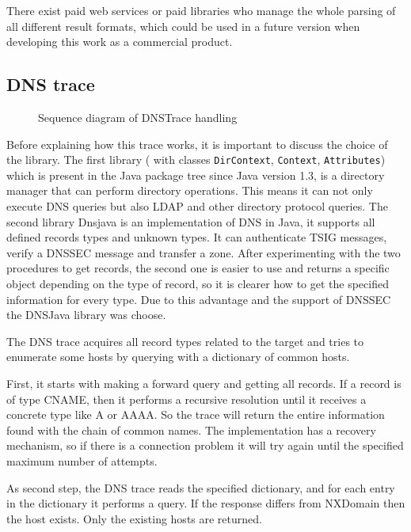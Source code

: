 \documentclass[
	a4paper,					10pt,							twoside,					openright,				notitlepage,			parskip=half,			]{scrreprt}
\begin{document}
There exist paid web services or paid libraries who manage the whole parsing of all 
different result formats, which could be used in a future version
when developing this work as a commercial product.

\subsection{\gls{DNS} trace}
\label{subsec:api_libstruct_dns}

\begin{figure}[H] 
\caption{Sequence diagram of DNSTrace handling}
\label{fig:seq-dnstrace}
\end{figure}

Before explaining how this trace works, it is important to discuss the choice of the library.
The first library ( with classes \verb|DirContext|, \verb|Context|, \verb|Attributes|) which 
is present in the Java package tree since Java version 1.3, is a directory manager that can 
perform directory operations. This means it can not only execute DNS queries but also LDAP and 
other directory protocol queries.
The second library Dnsjava\cite{dns:dnsjava} is an implementation of \gls{DNS} in Java, it supports 
all defined records types and unknown types. It can authenticate \gls{TSIG} messages, verify a \gls{DNSSEC} 
message and transfer a zone.
After experimenting with the two procedures to get records, the second one is easier to use and 
returns a specific object depending on the type of record, so it is clearer how to get the 
specified information for every type.
Due to this advantage and the support of \gls{DNSSEC} the DNSJava library was choose.

The \gls{DNS} trace acquires all record types related to the target and tries to enumerate some hosts
by querying with a dictionary of common hosts.

First, it starts with making a forward query and getting all records. If a record is of type CNAME,
then it performs a recursive resolution until it receives a concrete type like A or AAAA. So the 
trace will return the entire information found with the chain of common names. The implementation 
has a recovery mechanism, so if there is a connection problem it will try again until the specified 
maximum number of attempts.

As second step, the \gls{DNS} trace reads the specified dictionary, and for each entry in the dictionary
it performs a query. If the response differs from NXDomain then the host exists. Only the existing hosts are returned.
\end{document}
